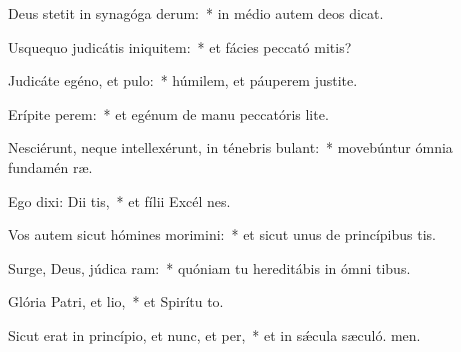 \item Deus stetit in synagóga derum:~* in médio autem deos dicat.
\item Usquequo judicátis iniquitem:~* et fácies peccató mitis?
\item Judicáte egéno, et pulo:~* húmilem, et páuperem justite.
\item Erípite perem:~* et egénum de manu peccatóris lite.
\item Nesciérunt, neque intellexérunt, in ténebris bulant:~* movebúntur ómnia fundamén ræ.
\item Ego dixi: Dii tis,~* et fílii Excél nes.
\item Vos autem sicut hómines morimini:~* et sicut unus de princípibus tis.
\item Surge, Deus, júdica ram:~* quóniam tu hereditábis in ómni tibus.
\item Glória Patri, et lio,~* et Spirítu to.
\item Sicut erat in princípio, et nunc, et per,~* et in sǽcula sæculó. men.
